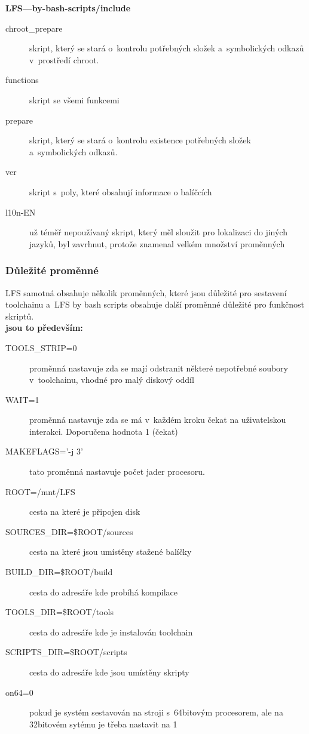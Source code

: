 \documentclass[a4paper,12pt]{article}
\renewcommand{\b}[1]{\textbf{#1}} %
\begin{document}
\b{LFS---by-bash-scripts/include}
\begin{description}
 \item[chroot\_prepare] skript, který se stará o~kontrolu potřebných složek a~symbolických odkazů v~prostředí chroot.
 \item[functions] skript se všemi funkcemi
 \item[prepare] skript, který se stará o~kontrolu existence potřebných složek a~symbolických odkazů.
 \item[ver] skript s~poly, které obsahují informace o balíčcích
 \item[l10n-EN] už téměř nepoužívaný skript, který měl sloužit pro lokalizaci do jiných jazyků, byl zavrhnut, protože znamenal velkém množství proměnných
 \end{description}

\subsubsection{Důležité proměnné}
LFS samotná obsahuje několik proměnných, které jsou důležité pro sestavení toolchainu a~LFS by bash scripts obsahuje další proměnné důležité pro funkčnost skriptů.\\

\b{jsou to především:}
\begin{description}
 \item[TOOLS\_STRIP=0] proměnná nastavuje zda se mají odstranit některé nepotřebné soubory v~toolchainu, vhodné pro malý diskový oddíl
 \item[WAIT=1] proměnná nastavuje zda se má v~každém kroku čekat na uživatelskou interakci. Doporučena hodnota 1 (čekat)
 \item[MAKEFLAGS='-j 3'] tato proměnná nastavuje počet jader procesoru.
 \item[ROOT=/mnt/LFS] cesta na které je připojen disk
 \item[SOURCES\_DIR=\$ROOT/sources] cesta na které jsou umístěny stažené balíčky
 \item[BUILD\_DIR=\$ROOT/build] cesta do adresáře kde probíhá kompilace
 \item[TOOLS\_DIR=\$ROOT/tools] cesta do adresáře kde je instalován toolchain
 \item[SCRIPTS\_DIR=\$ROOT/scripts] cesta do adresáře kde jsou umístěny skripty
 \item[on64=0] pokud je systém sestavován na stroji s~64bitovým procesorem, ale na 32bitovém sytému je třeba nastavit na 1
\end{description}
\end{document}
